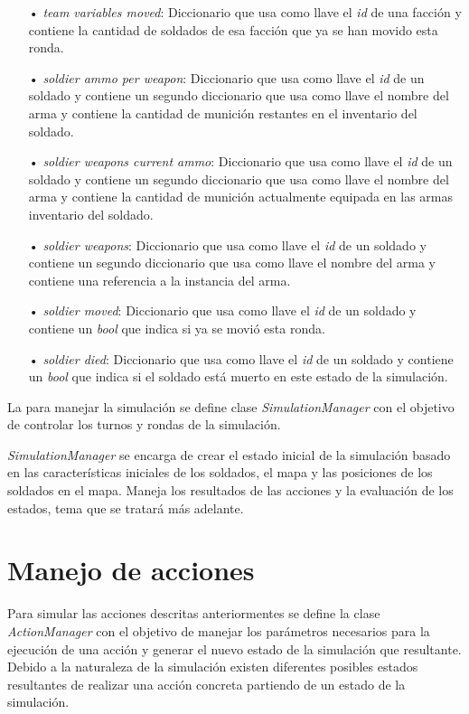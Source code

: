 \documentclass[twoside]{article}
\begin{document}
\begin{itemize}
	\item[•] \emph{team variables moved}: Diccionario que usa como llave el \emph{id} de una facci\'on y contiene la cantidad de soldados de esa facci\'on que ya se han movido esta ronda.
	\item[•] \emph{soldier ammo per weapon}: Diccionario que usa como llave el \emph{id} de un soldado y contiene un segundo diccionario que usa como llave el nombre del arma y contiene la cantidad de munici\'on restantes en el inventario del soldado.
	\item[•] \emph{soldier weapons current ammo}:  Diccionario que usa como llave el \emph{id} de un soldado y contiene un segundo diccionario que usa como llave el nombre del arma y contiene la cantidad de munici\'on actualmente equipada en las armas inventario del soldado.
	\item[•] \emph{soldier weapons}: Diccionario que usa como llave el \emph{id} de un soldado y contiene un segundo diccionario que usa como llave el nombre del arma y contiene una referencia a la instancia del arma.
	\item[•] \emph{soldier moved}: Diccionario que usa como llave el \emph{id} de un soldado y contiene un \emph{bool} que indica si ya se movi\'o esta ronda.
	\item[•] \emph{soldier died}: Diccionario que usa como llave el \emph{id} de un soldado y contiene un \emph{bool} que indica si el soldado est\'a muerto en este estado de la simulaci\'on.
	
\end{itemize}

La para manejar la simulaci\'on se define clase \emph{SimulationManager} con el objetivo de controlar los turnos y rondas de la simulaci\'on.

\emph{SimulationManager} se encarga de crear el estado inicial de la simulaci\'on basado en las caracter\'isticas iniciales de los soldados, el mapa y las posiciones de los soldados en el mapa. Maneja los resultados de las acciones y la evaluaci\'on de los estados, tema que se tratar\'a m\'as adelante.


\section{Manejo de acciones}

Para simular las acciones descritas anteriormentes se define la clase \emph{ActionManager} con el objetivo de manejar los par\'ametros necesarios para la ejecuci\'on de una acci\'on y generar el nuevo estado de la simulaci\'on que resultante. Debido a la naturaleza de la simulaci\'on existen diferentes posibles estados resultantes de realizar una acci\'on concreta partiendo de un estado de la simulaci\'on.
\end{document}
